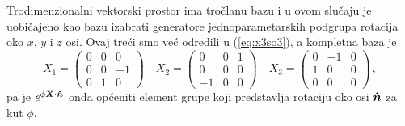 Trodimenzionalni vektorski prostor ima tročlanu bazu i u ovom slučaju je
uobičajeno kao bazu izabrati generatore jednoparametarskih podgrupa rotacija oko
$x$, $y$ i $z$ osi. Ovaj treći smo već odredili u (\ref{eq:x3so3}), a kompletna
baza je
\begin{equation}
X_1=
\begin{pmatrix}
0 & 0 & 0 \\ 
0 & 0 &-1 \\
0 & 1 & 0
\end{pmatrix}  \quad
X_2=
\begin{pmatrix}
0 & 0 & 1 \\ 
0 & 0 & 0 \\
-1& 0 & 0
\end{pmatrix}  \quad
X_3=
\begin{pmatrix}
0 & -1 & 0 \\ 
1& 0 & 0 \\
0 & 0 & 0
\end{pmatrix} \,,
\label{eq:SO3generators}
\end{equation}
pa je $e^{\phi \vec{X}\cdot\unitn}$ onda općeniti element grupe  koji
predstavlja rotaciju oko osi $\unitn$ za kut $\phi$.

